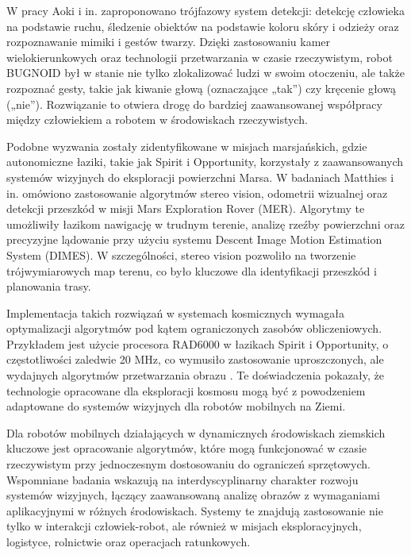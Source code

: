 \documentclass[a4paper,twoside,12pt]{book}
\begin{document}
W pracy Aoki i in. \cite{bib:aoki2001realtime} zaproponowano trójfazowy system detekcji: detekcję człowieka na podstawie ruchu, śledzenie obiektów na podstawie koloru skóry i odzieży oraz rozpoznawanie mimiki i gestów twarzy. Dzięki zastosowaniu kamer wielokierunkowych oraz technologii przetwarzania w czasie rzeczywistym, robot BUGNOID był w stanie nie tylko zlokalizować ludzi w swoim otoczeniu, ale także rozpoznać gesty, takie jak kiwanie głową (oznaczające „tak”) czy kręcenie głową („nie”). Rozwiązanie to otwiera drogę do bardziej zaawansowanej współpracy między człowiekiem a robotem w środowiskach rzeczywistych.

Podobne wyzwania zostały zidentyfikowane w misjach marsjańskich, gdzie autonomiczne łaziki, takie jak Spirit i Opportunity, korzystały z zaawansowanych systemów wizyjnych do eksploracji powierzchni Marsa. W badaniach Matthies i in. \cite{bib:matthies2007mars} omówiono zastosowanie algorytmów stereo vision, odometrii wizualnej oraz detekcji przeszkód w misji Mars Exploration Rover (MER). Algorytmy te umożliwiły łazikom nawigację w trudnym terenie, analizę rzeźby powierzchni oraz precyzyjne lądowanie przy użyciu systemu Descent Image Motion Estimation System (DIMES). W szczególności, stereo vision pozwoliło na tworzenie trójwymiarowych map terenu, co było kluczowe dla identyfikacji przeszkód i planowania trasy.

Implementacja takich rozwiązań w systemach kosmicznych wymagała optymalizacji algorytmów pod kątem ograniczonych zasobów obliczeniowych. Przykładem jest użycie procesora RAD6000 w łazikach Spirit i Opportunity, o częstotliwości zaledwie 20 MHz, co wymusiło zastosowanie uproszczonych, ale wydajnych algorytmów przetwarzania obrazu \cite{bib:matthies2007mars}. Te doświadczenia pokazały, że technologie opracowane dla eksploracji kosmosu mogą być z powodzeniem adaptowane do systemów wizyjnych dla robotów mobilnych na Ziemi.

Dla robotów mobilnych działających w dynamicznych środowiskach ziemskich kluczowe jest opracowanie algorytmów, które mogą funkcjonować w czasie rzeczywistym przy jednoczesnym dostosowaniu do ograniczeń sprzętowych. Wspomniane badania \cite{bib:aoki2001realtime} \cite{bib:matthies2007mars} wskazują na interdyscyplinarny charakter rozwoju systemów wizyjnych, łączący zaawansowaną analizę obrazów z wymaganiami aplikacyjnymi w różnych środowiskach. Systemy te znajdują zastosowanie nie tylko w interakcji człowiek-robot, ale również w misjach eksploracyjnych, logistyce, rolnictwie oraz operacjach ratunkowych.
\end{document}
